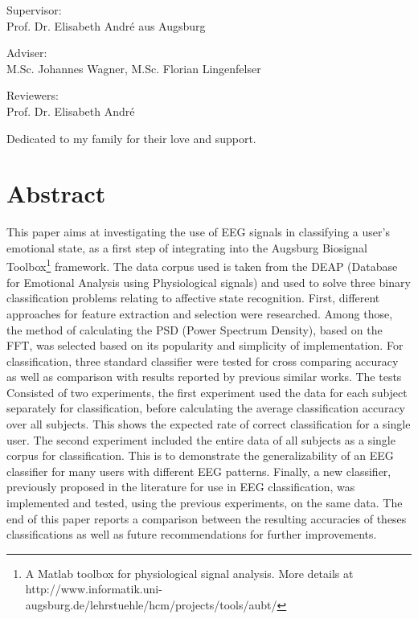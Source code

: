 \documentclass[12pt, a4paper, fleqn]{memoir}%
\begin{document}
\vspace{2.0em}
\begin{center}
    \normalsize
    Supervisor:\\ 
    Prof. Dr. Elisabeth Andr\'{e} aus Augsburg
\end{center}
\begin{center}
    \normalsize
    Adviser:\\
    M.Sc. Johannes Wagner,
    M.Sc. Florian Lingenfelser 
\end{center}
\begin{center}
    \normalsize
    Reviewers:\\
    Prof. Dr. Elisabeth Andr\'{e}\\
\end{center}
\cleardoublepage

\vspace*{\fill}
{\hfill\sffamily\itshape} Dedicated to my family for their love and support. 
\cleardoublepage

\chapter*{Abstract}
This paper aims at investigating the use of EEG signals in classifying a user's emotional state, as a first step of integrating into the Augsburg Biosignal Toolbox\footnote{A Matlab toolbox for physiological signal analysis. More details at http://www.informatik.uni-augsburg.de/lehrstuehle/hcm/projects/tools/aubt/} framework. The data corpus used is taken from the DEAP (Database for Emotional Analysis using Physiological signals) and used to solve three binary classification problems relating to affective state recognition. First, different approaches for feature extraction and selection were researched. Among those, the method of calculating the PSD (Power Spectrum Density), based on the FFT,  was selected based on its popularity and simplicity of implementation. For classification, three standard classifier were tested for cross comparing accuracy as well as comparison with results reported by previous similar works. The tests Consisted of two experiments, the first experiment used the data for each subject separately for classification, before calculating the average classification accuracy over all subjects. This shows the expected rate of correct classification for a single user. The second experiment included the entire data of all subjects as a single corpus for classification. This is to demonstrate the generalizability of an EEG classifier for many users with different EEG patterns. Finally, a new classifier, previously proposed in the literature for use in EEG classification, was implemented and tested, using the previous experiments, on the same data. The end of this paper reports a comparison between the resulting accuracies of theses classifications as well as future recommendations for further improvements. 
\end{document}
